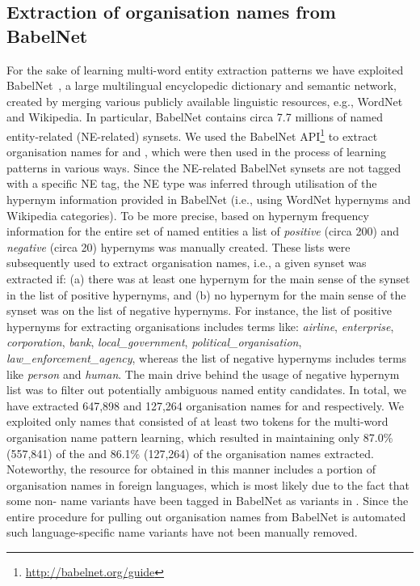 \documentclass[output=paper]{langsci/langscibook}
\begin{document}
\subsection{Extraction of organisation names from BabelNet}
\label{jac:sec:babelnet}

For the sake of learning multi-word entity extraction patterns we have exploited BabelNet~\citep{navigli-12},
a large multilingual encyclopedic dictionary and semantic network, created by merging various publicly available linguistic resources, e.g., WordNet and Wikipedia. In particular, BabelNet contains circa 7.7 millions of named entity-related (NE-related) synsets. We used the BabelNet API\footnote{\url{http://babelnet.org/guide}} to extract organisation names for  and , which were then used in the process of learning patterns in various ways. Since the NE-related BabelNet synsets are not tagged with a specific NE tag, the NE type was inferred through utilisation of the hypernym information provided in BabelNet (i.e., using WordNet hypernyms and Wikipedia categories). To be more precise, based on hypernym frequency information for the entire set of named entities a list of \textit{positive} (circa 200) and \textit{negative} (circa 20) hypernyms was manually created. These lists were subsequently used to extract organisation names, i.e., a given synset was extracted if: (a) there was at least one hypernym for the main sense of the synset in the list of positive hypernyms, and (b) no hypernym for the main sense of the synset was on the list of negative hypernyms. For instance, the list of positive hypernyms for extracting organisations includes terms like: \textit{airline}, \textit{enterprise}, \textit{corporation}, \textit{bank}, \textit{local\_government}, \textit{political\_organisation}, \textit{law\_enforcement\_agency}, whereas the list of negative hypernyms includes terms like \textit{person} and \textit{human}. The main drive behind the usage of negative hypernym list was to filter out potentially ambiguous named entity candidates. In total, we have extracted 647,898 and 127,264 organisation names for  and  respectively. We exploited only names that consisted of at least two tokens for the multi-word organisation name pattern learning, which resulted in maintaining only 87.0\% (557,841) of the  and 86.1\% (127,264) of the  organisation names extracted. Noteworthy, the resource for  obtained in this manner includes a portion of organisation names in foreign languages, which is most likely due to the fact that some non- name variants have been tagged in BabelNet as variants in . Since the entire procedure for pulling out organisation names from BabelNet is automated such language-specific name variants have not been manually removed.
\end{document}
